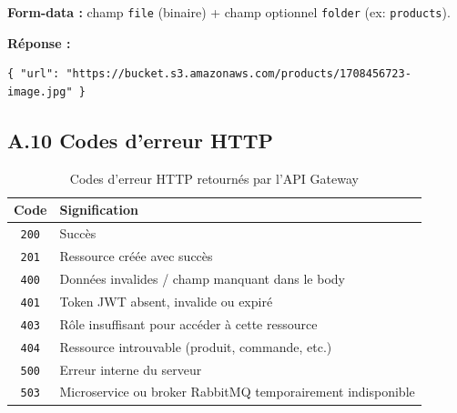 \textbf{Form-data :} champ \texttt{file} (binaire) + champ optionnel \texttt{folder} (ex: \texttt{products}).

\textbf{Réponse :}
\begin{verbatim}
{ "url": "https://bucket.s3.amazonaws.com/products/1708456723-image.jpg" }
\end{verbatim}

\subsection*{A.10 Codes d'erreur HTTP}

\begin{table}[H]
    \centering
    \begin{tabular}{|c|p{10cm}|}
        \hline
        \textbf{Code} & \textbf{Signification} \\
        \hline
        \texttt{200} & Succès \\
        \texttt{201} & Ressource créée avec succès \\
        \texttt{400} & Données invalides / champ manquant dans le body \\
        \texttt{401} & Token JWT absent, invalide ou expiré \\
        \texttt{403} & Rôle insuffisant pour accéder à cette ressource \\
        \texttt{404} & Ressource introuvable (produit, commande, etc.) \\
        \texttt{500} & Erreur interne du serveur \\
        \texttt{503} & Microservice ou broker RabbitMQ temporairement indisponible \\
        \hline
    \end{tabular}
    \caption{Codes d'erreur HTTP retournés par l'API Gateway}
\end{table}
